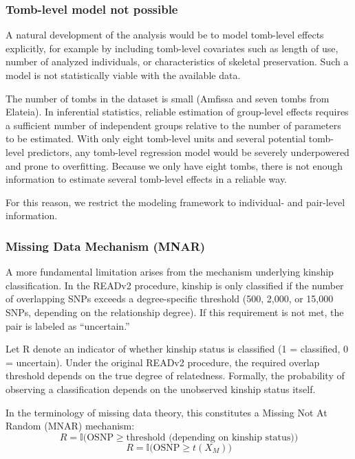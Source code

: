 \documentclass[
]{ajs}
\begin{document}
\subsubsection{Tomb-level model not
possible}\label{tomb-level-model-not-possible}

A natural development of the analysis would be to model tomb-level
effects explicitly, for example by including tomb-level covariates such
as length of use, number of analyzed individuals, or characteristics of
skeletal preservation. Such a model is not statistically viable with the
available data.

The number of tombs in the dataset is small (Amfissa and seven tombs
from Elateia). In inferential statistics, reliable estimation of
group-level effects requires a sufficient number of independent groups
relative to the number of parameters to be estimated. With only eight
tomb-level units and several potential tomb-level predictors, any
tomb-level regression model would be severely underpowered and prone to
overfitting. Because we only have eight tombs, there is not enough
information to estimate several tomb-level effects in a reliable way.

For this reason, we restrict the modeling framework to individual- and
pair-level information.

\subsubsection{Missing Data Mechanism
(MNAR)}\label{missing-data-mechanism-mnar}

A more fundamental limitation arises from the mechanism underlying
kinship classification. In the READv2 procedure, kinship is only
classified if the number of overlapping SNPs exceeds a degree-specific
threshold (500, 2,000, or 15,000 SNPs, depending on the relationship
degree). If this requirement is not met, the pair is labeled as
``uncertain.''

Let R denote an indicator of whether kinship status is classified (1 =
classified, 0 = uncertain). Under the original READv2 procedure, the
required overlap threshold depends on the true degree of relatedness.
Formally, the probability of observing a classification depends on the
unobserved kinship status itself.

In the terminology of missing data theory, this constitutes a Missing
Not At Random (MNAR) mechanism: \[
R = \mathbb{I}\big(\mathrm{OSNP} \ge \text{threshold (depending on kinship status)}\big)
\] \[
R = \mathbb{I}\big(\mathrm{OSNP} \ge t(X_M)\big)
\]
\end{document}
